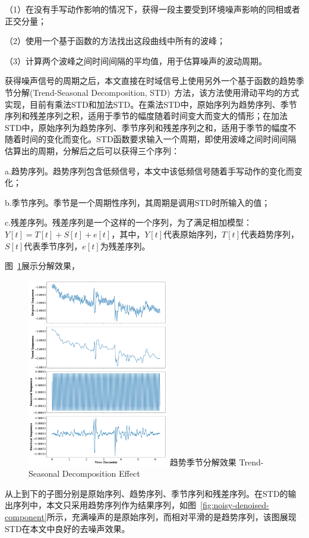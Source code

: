 （1）在没有手写动作影响的情况下，获得一段主要受到环境噪声影响的同相或者正交分量；

（2）使用一个基于函数的方法找出这段曲线中所有的波峰；

（3）计算两个波峰之间时间间隔的平均值，用于估算噪声的波动周期。

获得噪声信号的周期之后，本文直接在时域信号上使用另外一个基于函数的趋势季节分解(Trend-Seasonal Decomposition, STD)~\cite{cleveland1990stl}方法，该方法使用滑动平均的方式实现，目前有乘法STD和加法STD。在乘法STD中，原始序列为趋势序列、季节序列和残差序列之积，适用于季节的幅度随着时间变大而变大的情形；在加法STD中，原始序列为趋势序列、季节序列和残差序列之和，适用于季节的幅度不随着时间的变化而变化。STD函数要求输入一个周期，即使用波峰之间时间间隔估算出的周期，分解后之后可以获得三个序列：

a.趋势序列。趋势序列包含低频信号，本文中该低频信号随着手写动作的变化而变化；

b.季节序列。季节是一个周期性序列，其周期是调用STD时所输入的值；

c.残差序列。残差序列是一个这样的一个序列，为了满足相加模型：$Y[t] = T[t] + S[t] + e[t]$，其中，$Y[t]$代表原始序列，$T[t]$代表趋势序列，$S[t]$代表季节序列，$e[t]$为残差序列。

图~\ref{fig:trend-seasonal-decomposition-effect}展示分解效果，
\begin{figure}[!htp]
  \centering
  \includegraphics[width=0.55\textwidth]{figure/std-effect.pdf}
  \bicaption
    {趋势季节分解效果}
    {Trend-Seasonal Decomposition Effect}
  \label{fig:trend-seasonal-decomposition-effect}
\end{figure}
从上到下的子图分别是原始序列、趋势序列、季节序列和残差序列。在STD的输出序列中，本文只采用趋势序列作为结果序列，如图~\ref{fig:noisy-denoised-component}所示，充满噪声的是原始序列，而相对平滑的是趋势序列，该图展现STD在本文中良好的去噪声效果。

